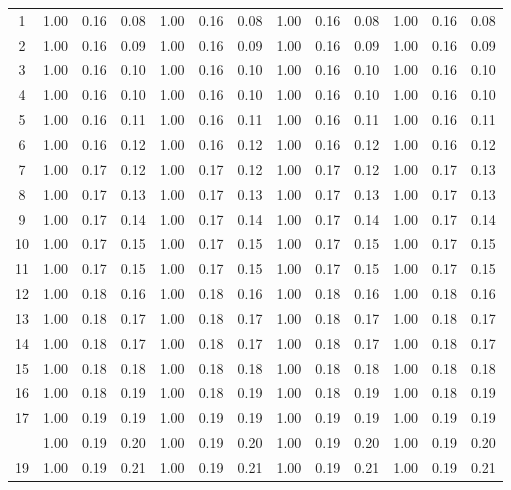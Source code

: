 \begin{longtable}[c]{|c|c|c|c|c|c|c|c|c|c|c|c|c|}
 1 & 1.00 & 0.16 & 0.08 & 1.00 & 0.16 & 0.08 & 1.00 & 0.16 & 0.08 & 1.00 & 0.16 & 0.08 \\
 2 & 1.00 & 0.16 & 0.09 & 1.00 & 0.16 & 0.09 & 1.00 & 0.16 & 0.09 & 1.00 & 0.16 & 0.09 \\
 3 & 1.00 & 0.16 & 0.10 & 1.00 & 0.16 & 0.10 & 1.00 & 0.16 & 0.10 & 1.00 & 0.16 & 0.10 \\
 4 & 1.00 & 0.16 & 0.10 & 1.00 & 0.16 & 0.10 & 1.00 & 0.16 & 0.10 & 1.00 & 0.16 & 0.10 \\
 5 & 1.00 & 0.16 & 0.11 & 1.00 & 0.16 & 0.11 & 1.00 & 0.16 & 0.11 & 1.00 & 0.16 & 0.11 \\
 6 & 1.00 & 0.16 & 0.12 & 1.00 & 0.16 & 0.12 & 1.00 & 0.16 & 0.12 & 1.00 & 0.16 & 0.12 \\
 7 & 1.00 & 0.17 & 0.12 & 1.00 & 0.17 & 0.12 & 1.00 & 0.17 & 0.12 & 1.00 & 0.17 & 0.13 \\
 8 & 1.00 & 0.17 & 0.13 & 1.00 & 0.17 & 0.13 & 1.00 & 0.17 & 0.13 & 1.00 & 0.17 & 0.13 \\
 9 & 1.00 & 0.17 & 0.14 & 1.00 & 0.17 & 0.14 & 1.00 & 0.17 & 0.14 & 1.00 & 0.17 & 0.14 \\
10 & 1.00 & 0.17 & 0.15 & 1.00 & 0.17 & 0.15 & 1.00 & 0.17 & 0.15 & 1.00 & 0.17 & 0.15 \\
11 & 1.00 & 0.17 & 0.15 & 1.00 & 0.17 & 0.15 & 1.00 & 0.17 & 0.15 & 1.00 & 0.17 & 0.15 \\
12 & 1.00 & 0.18 & 0.16 & 1.00 & 0.18 & 0.16 & 1.00 & 0.18 & 0.16 & 1.00 & 0.18 & 0.16 \\
13 & 1.00 & 0.18 & 0.17 & 1.00 & 0.18 & 0.17 & 1.00 & 0.18 & 0.17 & 1.00 & 0.18 & 0.17 \\
14 & 1.00 & 0.18 & 0.17 & 1.00 & 0.18 & 0.17 & 1.00 & 0.18 & 0.17 & 1.00 & 0.18 & 0.17 \\
15 & 1.00 & 0.18 & 0.18 & 1.00 & 0.18 & 0.18 & 1.00 & 0.18 & 0.18 & 1.00 & 0.18 & 0.18 \\
16 & 1.00 & 0.18 & 0.19 & 1.00 & 0.18 & 0.19 & 1.00 & 0.18 & 0.19 & 1.00 & 0.18 & 0.19 \\
17 & 1.00 & 0.19 & 0.19 & 1.00 & 0.19 & 0.19 & 1.00 & 0.19 & 0.19 & 1.00 & 0.19 & 0.19 \\
\pagebreak
18 & 1.00 & 0.19 & 0.20 & 1.00 & 0.19 & 0.20 & 1.00 & 0.19 & 0.20 & 1.00 & 0.19 & 0.20 \\
19 & 1.00 & 0.19 & 0.21 & 1.00 & 0.19 & 0.21 & 1.00 & 0.19 & 0.21 & 1.00 & 0.19 & 0.21 \\

\end{longtable}
